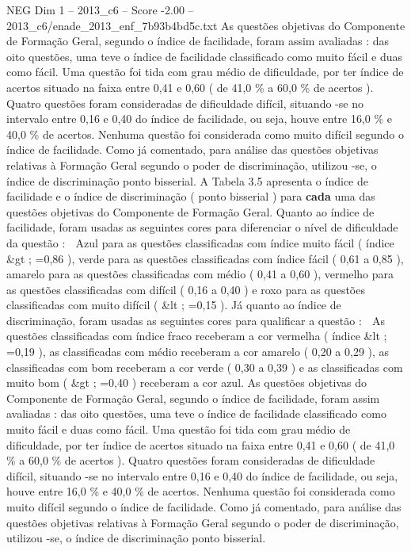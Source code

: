 \begin{textsample}{NEG Dim 1 – 2013\_c6 – Score -2.00 – 2013\_c6/enade\_2013\_enf\_7b93b4bd5c.txt}
As questões objetivas do Componente de Formação Geral, segundo o índice de facilidade, foram assim avaliadas : das oito questões, uma teve o índice de facilidade classificado como muito fácil e duas como fácil.
Uma questão foi tida com grau médio de dificuldade, por ter índice de acertos situado na faixa entre 0,41 e 0,60 ( de 41,0 \% a 60,0 \% de acertos ).
Quatro questões foram consideradas de dificuldade difícil, situando -se no intervalo entre 0,16 e 0,40 do índice de facilidade, ou seja, houve entre 16,0 \% e 40,0 \% de acertos.
Nenhuma questão foi considerada como muito difícil segundo o índice de facilidade.
Como já comentado, para análise das questões objetivas relativas à Formação Geral segundo o poder de discriminação, utilizou -se, o índice de discriminação ponto bisserial.
A Tabela 3.5 apresenta o índice de facilidade e o índice de discriminação ( ponto bisserial ) para \textbf{cada} uma das questões objetivas do Componente de Formação Geral.
Quanto ao índice de facilidade, foram usadas as seguintes cores para diferenciar o nível de dificuldade da questão :  Azul para as questões classificadas com índice muito fácil ( índice \&gt ; =0,86 ), verde para as questões classificadas com índice fácil ( 0,61 a 0,85 ), amarelo para as questões classificadas com médio ( 0,41 a 0,60 ), vermelho para as questões classificadas com difícil ( 0,16 a 0,40 ) e roxo para as questões classificadas com muito difícil ( \&lt ; =0,15 ).
Já quanto ao índice de discriminação, foram usadas as seguintes cores para qualificar a questão :  As questões classificadas com índice fraco receberam a cor vermelha ( índice \&lt ; =0,19 ), as classificadas com médio receberam a cor amarelo ( 0,20 a 0,29 ), as classificadas com bom receberam a cor verde ( 0,30 a 0,39 ) e as classificadas com muito bom ( \&gt ; =0,40 ) receberam a cor azul.
As questões objetivas do Componente de Formação Geral, segundo o índice de facilidade, foram assim avaliadas : das oito questões, uma teve o índice de facilidade classificado como muito fácil e duas como fácil.
Uma questão foi tida com grau médio de dificuldade, por ter índice de acertos situado na faixa entre 0,41 e 0,60 ( de 41,0 \% a 60,0 \% de acertos ).
Quatro questões foram consideradas de dificuldade difícil, situando -se no intervalo entre 0,16 e 0,40 do índice de facilidade, ou seja, houve entre 16,0 \% e 40,0 \% de acertos.
Nenhuma questão foi considerada como muito difícil segundo o índice de facilidade.
Como já comentado, para análise das questões objetivas relativas à Formação Geral segundo o poder de discriminação, utilizou -se, o índice de discriminação ponto bisserial.

\end{textsample}

